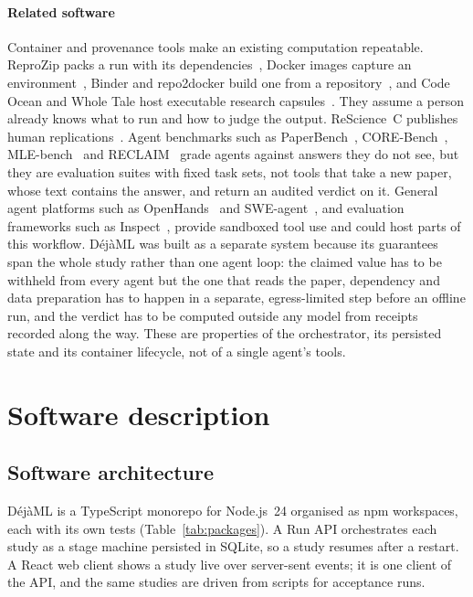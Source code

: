 \documentclass[preprint,12pt]{elsarticle}
\newcommand{\dejaml}{D\'ej\`aML}
\begin{document}
\paragraph{Related software}
Container and provenance tools make an existing computation repeatable.
ReproZip packs a run with its dependencies~\cite{chirigati2016reprozip}, Docker
images capture an environment~\cite{boettiger2015introduction}, Binder and
repo2docker build one from a repository~\cite{jupyter2018binder}, and Code
Ocean and Whole Tale host executable research
capsules~\cite{clyburne2019computational,brinckman2019computing}. They assume a
person already knows what to run and how to judge the output. ReScience~C
publishes human replications~\cite{rougier2017sustainable}. Agent benchmarks
such as PaperBench~\cite{starace2025paperbench},
CORE-Bench~\cite{siegel2024corebench}, MLE-bench~\cite{chan2024mlebench} and
RECLAIM~\cite{salunkhe2026reclaim} grade agents against answers they do not
see, but they are evaluation suites with fixed task sets, not tools that take a
new paper, whose text contains the answer, and return an audited verdict on it.
General agent platforms such as OpenHands~\cite{wang2025openhands} and
SWE-agent~\cite{yang2024sweagent}, and evaluation frameworks such as
Inspect~\cite{inspect2024}, provide sandboxed tool use and could host parts of
this workflow. \dejaml{} was built as a separate system because its
guarantees span the whole study rather than one agent loop: the claimed value
has to be withheld from every agent but the one that reads the paper,
dependency and data preparation has to happen in a separate, egress-limited
step before an offline run, and the verdict has to be computed outside any
model from receipts recorded along the way. These are properties of the
orchestrator, its persisted state and its container lifecycle, not of a
single agent's tools.

\section{Software description}
\label{sec:description}

\subsection{Software architecture}

\dejaml{} is a TypeScript monorepo for Node.js~24 organised as npm workspaces,
each with its own tests (Table~\ref{tab:packages}). A Run API orchestrates each
study as a stage machine persisted in SQLite, so a study resumes after a
restart. A React web client shows a study live over server-sent events; it is
one client of the API, and the same studies are driven from scripts for
acceptance runs.
\end{document}
